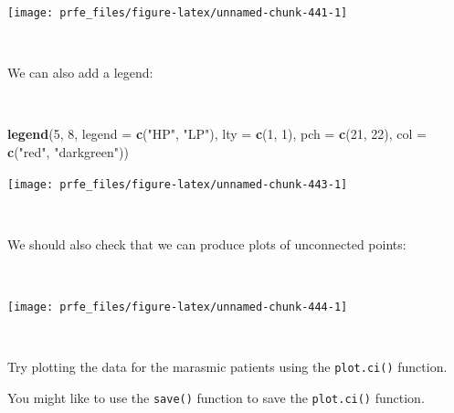 \documentclass[12pt,a4paper]{book}
\newenvironment{Shaded}{\begin{snugshade}}{\end{snugshade}}
\newcommand{\DataTypeTok}[1]{\textcolor[rgb]{0.13,0.29,0.53}{#1}}
\newcommand{\DecValTok}[1]{\textcolor[rgb]{0.00,0.00,0.81}{#1}}
\newcommand{\KeywordTok}[1]{\textcolor[rgb]{0.13,0.29,0.53}{\textbf{#1}}}
\newcommand{\NormalTok}[1]{#1}
\newcommand{\OperatorTok}[1]{\textcolor[rgb]{0.81,0.36,0.00}{\textbf{#1}}}
\newcommand{\StringTok}[1]{\textcolor[rgb]{0.31,0.60,0.02}{#1}}
\theoremstyle{definition}
\theoremstyle{definition}
\theoremstyle{definition}
\theoremstyle{remark}
\begin{document}
\newpage

\begin{center}\texttt{[image: prfe\_files/figure-latex/unnamed-chunk-441-1]} \end{center}

~

We can also add a legend:

~

\begin{Shaded}
\begin{Highlighting}[]
\KeywordTok{legend}\NormalTok{(}\DecValTok{5}\NormalTok{, }\DecValTok{8}\NormalTok{, }\DataTypeTok{legend =} \KeywordTok{c}\NormalTok{(}\StringTok{"HP"}\NormalTok{, }\StringTok{"LP"}\NormalTok{), }\DataTypeTok{lty =} \KeywordTok{c}\NormalTok{(}\DecValTok{1}\NormalTok{, }\DecValTok{1}\NormalTok{),}
       \DataTypeTok{pch =} \KeywordTok{c}\NormalTok{(}\DecValTok{21}\NormalTok{, }\DecValTok{22}\NormalTok{), }\DataTypeTok{col =} \KeywordTok{c}\NormalTok{(}\StringTok{"red"}\NormalTok{, }\StringTok{"darkgreen"}\NormalTok{))}
\end{Highlighting}
\end{Shaded}

\begin{center}\texttt{[image: prfe\_files/figure-latex/unnamed-chunk-443-1]} \end{center}

~

We should also check that we can produce plots of unconnected points:

~

\begin{Shaded}
\end{Shaded}

\begin{center}\texttt{[image: prfe\_files/figure-latex/unnamed-chunk-444-1]} \end{center}

~

Try plotting the data for the marasmic patients using the
\texttt{plot.ci()} function.

You might like to use the \texttt{save()} function to save the
\texttt{plot.ci()} function.
\end{document}
